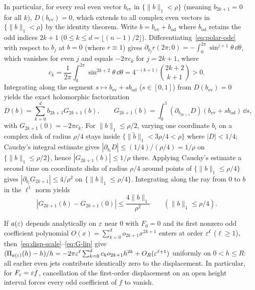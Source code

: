 In particular, for every real even vector $b_{\mathrm{ev}}$ in $\{\|b\|_1<\rho\}$ (meaning $b_{2k+1}=0$ for all $k$), $D(b_{\mathrm{ev}})=0$, which extends to all complex even vectors in $\{\|b\|_1<\rho\}$ by the identity theorem. Write $b=b_{\mathrm{ev}}+b_{\mathrm{od}}$ where $b_{\mathrm{od}}$ retains the odd indices $2k+1$ ($0\le k\le d=\lfloor(n-1)/2\rfloor$). Differentiating~\eqref{eq:polar-ode} with respect to $b_j$ at $b=0$ (where $r\equiv 1$) gives $\partial_{b_j}r(2\pi;0)=-\int_0^{2\pi}\sin^{j+1}\theta\,\dd\theta$, which vanishes for even $j$ and equals $-2\pi c_k$ for $j=2k+1$, where
\begin{equation}\label{eq:sine-moments}
  c_k = \frac{1}{2\pi}\int_0^{2\pi}\sin^{2k+2}\theta\,\dd\theta = 4^{-(k+1)}\binom{2k+2}{k+1} > 0.
\end{equation}
Integrating along the segment $s\mapsto b_{\mathrm{ev}}+s b_{\mathrm{od}}$ ($s\in[0,1]$) from $D(b_{\mathrm{ev}})=0$ yields the exact holomorphic factorization
\begin{equation}\label{eq:D-factor}
  D(b) = \sum_{k=0}^d b_{2k+1} G_{2k+1}(b),\qquad
  G_{2k+1}(b) = \int_0^1 (\partial_{b_{2k+1}}D)(b_{\mathrm{ev}}+s b_{\mathrm{od}})\,\dd s,
\end{equation}
with $G_{2k+1}(0)=-2\pi c_k$. For $\|b\|_1\le\rho/2$, varying one coordinate $b_i$ on a complex disk of radius $\rho/4$ stays inside $\{\|\tilde b\|_1<3\rho/4<\rho\}$ where $|D|<1/4$; Cauchy's integral estimate gives $|\partial_{b_i}D|\le (1/4)/(\rho/4)=1/\rho$ on $\{\|b\|_1\le\rho/2\}$, hence $|G_{2k+1}(b)|\le 1/\rho$ there. Applying Cauchy's estimate a second time on coordinate disks of radius $\rho/4$ around points of $\{\|b\|_1\le\rho/4\}$ gives $|\partial_{b_i}G_{2k+1}|\le 4/\rho^2$ on $\{\|b\|_1\le\rho/4\}$. Integrating along the ray from $0$ to $b$ in the $\ell^1$ norm yields
\begin{equation}\label{eq:G-lip}
  |G_{2k+1}(b) - G_{2k+1}(0)| \le \frac{4\|b\|_1}{\rho^2}\qquad (\|b\|_1\le\rho/4).
\end{equation}

\begin{remark}\label{rem:odd-jet}
If $a(\varepsilon)$ depends analytically on $\varepsilon$ near $0$ with $F_0=0$ and its first nonzero odd coefficient polynomial $O(x)=\sum_{k=0}^d o_{2k+1}x^{2k+1}$ enters at order $\varepsilon^\ell$ ($\ell\ge 1$), then~\eqref{eq:disp-scale}--\eqref{eq:G-lip} give $(\Pi_{a(\varepsilon)}(h)-h)/h=-2\pi\varepsilon^\ell\sum_{k=0}^d c_k o_{2k+1}h^{2k}+O_R(\varepsilon^{\ell+1})$ uniformly on $0<h\le R$: all earlier even jets contribute identically zero to the displacement. In particular, for $F_\varepsilon=\varepsilon f$, cancellation of the first-order displacement on an open height interval forces every odd coefficient of $f$ to vanish.
\end{remark}

